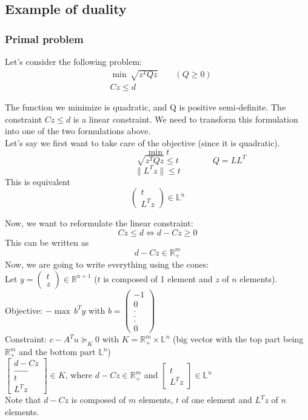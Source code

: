 \subsection{Example of duality}

\subsubsection{Primal problem}
Let's consider the following problem: 
\begin{align*}
&\min \, \sqrt{z^TQz} \qquad (Q\geq 0)\\
&Cz \leq d
\end{align*}

The function we minimize is quadratic, and Q is positive semi-definite. The constraint $Cz \leq d$ is a linear constraint. We need to transform this formulation into one of the two formulations above. \\
Let's say we first want to take care of the objective (since it is quadratic). 
$$\min \, t$$
$$\qquad \qquad \qquad \qquad \sqrt{z^TQz}\leq t \qquad \qquad Q=LL^T$$
$$\parallel L^Tz \parallel \leq t$$
This is equivalent 
$$\begin{pmatrix}
t\\
L^Tz
\end{pmatrix} \in \mathbb{L}^n$$

Now, we want to reformulate the linear constraint: 
$$Cz\leq d \Longleftrightarrow d-Cz \geq 0$$
This can be written as 
$$d-Cz \in \mathbb{R}^m_+$$
Now, we are going to write everything using the cones: \\
Let $y=\begin{pmatrix}
t\\
z
\end{pmatrix} \in \mathbb{R}^{n+1}$ ($t$ is composed of 1 element and $z$ of $n$ elements). \\
Objective: $-\max \, b^Ty$ with $b=\begin{pmatrix}
-1\\
0\\
. \\
. \\
. \\
0
\end{pmatrix}$\\
Constraint: $c-A^Tu \succeq_K 0 $ with $K= \mathbb{R}^m_+ \times \mathbb{L}^n$ (big vector with the top part being $\mathbb{R}^m_+$ and the bottom part $\mathbb{L}^n$)\\

$\begin{bmatrix}
d-Cz\\
\_ \_ \_ \_ \_ \\
t\\
L^Tz
\end{bmatrix} \in K$, where $d-Cz \in \mathbb{R}^m_+$ and $\begin{bmatrix}
t\\
L^Tz
\end{bmatrix} \in \mathbb{L}^n$\\
Note that $d-Cz$ is composed of $m$ elements, $t$ of one element and $L^Tz$ of $n$ elements. \\

